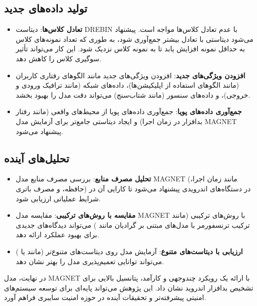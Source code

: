 \subsection{تولید داده‌های جدید}
\begin{itemize}
    \item \textbf{تعادل کلاس‌ها}: دیتاست DREBIN با عدم تعادل کلاس‌ها مواجه است. پیشنهاد می‌شود دیتاستی با تعادل بیشتر جمع‌آوری شود، به طوری که تعداد نمونه‌های کلاس  به حداقل  نمونه افزایش یابد تا به  نمونه کلاس  نزدیک شود. این کار می‌تواند تأثیر سوگیری کلاس را کاهش دهد.
    \item \textbf{افزودن ویژگی‌های جدید}: افزودن ویژگی‌های جدید مانند الگوهای رفتاری کاربران (مانند الگوهای استفاده از اپلیکیشن‌ها)، داده‌های شبکه (مانند ترافیک ورودی و خروجی)، و داده‌های سنسور (مانند شتاب‌سنج) می‌تواند دقت مدل را بهبود بخشد.
    \item \textbf{جمع‌آوری داده‌های پویا}: جمع‌آوری داده‌های پویا از محیط‌های واقعی (مانند رفتار بدافزار در زمان اجرا) و ایجاد دیتاستی جامع‌تر برای آزمایش مدل MAGNET پیشنهاد می‌شود.
\end{itemize}

\subsection{تحلیل‌های آینده}
\begin{itemize}
    \item \textbf{تحلیل مصرف منابع}: بررسی مصرف منابع مدل MAGNET (مانند زمان اجرا، حافظه، و مصرف باتری) در دستگاه‌های اندرویدی پیشنهاد می‌شود تا کارایی آن در شرایط عملیاتی ارزیابی شود.
    \item \textbf{مقایسه با روش‌های ترکیبی}: مقایسه مدل MAGNET با روش‌های ترکیبی (مانند ترکیب ترنسفورمر با مدل‌های مبتنی بر گرادیان مانند ) می‌تواند دیدگاه‌های جدیدی برای بهبود عملکرد ارائه دهد.
    \item \textbf{ارزیابی با دیتاست‌های متنوع}: آزمایش مدل روی دیتاست‌های متنوع‌تر (مانند  \cite{CICMalDroid} یا  \cite{VirusShare}) می‌تواند توانایی تعمیم‌پذیری مدل را بهتر نشان دهد.
\end{itemize}

در نهایت، مدل MAGNET با ارائه یک رویکرد چندوجهی و کارآمد، پتانسیل بالایی برای تشخیص بدافزار اندروید نشان داد. این پژوهش می‌تواند پایه‌ای برای توسعه سیستم‌های امنیتی پیشرفته‌تر و تحقیقات آینده در حوزه امنیت سایبری فراهم آورد.
